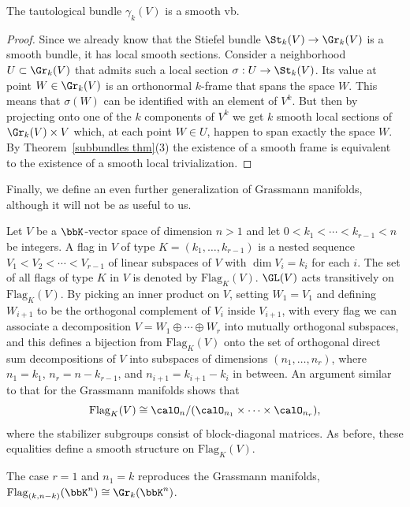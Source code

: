 \begin{prop}
    The tautological bundle $\gamma_k(V)$ is a smooth \gls{vb}.
\end{prop}
\begin{proof}
    Since we already know that the Stiefel bundle $\St_k(V)\to \Gr_k(V)$ is a smooth bundle, it has local smooth sections. Consider a neighborhood $U\subset \Gr_k(V)$ that admits such a local section $\sigma:U\to \St_k(V)$. Its value at point $W\in \Gr_k(V)$ is an orthonormal $k$-frame that spans the space $W$. This means that $\sigma(W)$ can be identified with an element of $V^k$. But then by projecting onto one of the $k$ components of $V^k$ we get $k$ smooth local sections of $\Gr_k(V)\times V$ which, at each point $W\in U$, happen to span exactly the space $W$. By Theorem~\ref{subbundles thm}(3) the existence of a smooth frame is equivalent to the existence of a smooth local trivialization.
\end{proof}

Finally, we define an even further generalization of Grassmann manifolds, although it will not be as useful to us.

\begin{defn}
    Let $V$ be a $\bbK$-vector space of dimension $n>1$ and let $0<k_1<\cdots<k_{r-1}<n$ be integers. A flag in $V$ of type $K=(k_1,\ldots,k_{r-1})$ is a nested sequence $V_1< V_2< \cdots < V_{r-1}$ of linear subspaces of $V$ with $\dim V_i=k_i$ for each $i$. The set of all flags of type $K$ in $V$ is denoted by $\mathrm{Flag}_K(V)$. $\GL(V)$ acts transitively on $\mathrm{Flag}_K(V)$. By picking an inner product on $V$, setting $W_1=V_1$ and defining $W_{i+1}$ to be the orthogonal complement of $V_i$ inside $V_{i+1}$, with every flag we can associate a decomposition $V=W_1\oplus \cdots\oplus W_r$ into mutually orthogonal subspaces, and this defines a bijection from $\mathrm{Flag}_K(V)$ onto the set of orthogonal direct sum decompositions of $V$ into subspaces of dimensions $(n_1,\ldots,n_r)$, where $n_1=k_1$, $n_r=n-k_{r-1}$, and $n_{i+1}=k_{i+1}-k_i$ in between. An argument similar to that for the Grassmann manifolds shows that
    \[\mathrm{Flag}_K(V)\cong \calO_n\slash (\calO_{n_1}\times\cdots\times\calO_{n_r}),\]
    where the stabilizer subgroups consist of block-diagonal matrices. As before, these equalities define a smooth structure on $\mathrm{Flag}_K(V)$.
\end{defn}

The case $r=1$ and $n_1=k$ reproduces the Grassmann manifolds, $\mathrm{Flag}_{(k,n-k)}(\bbK^n)\cong \Gr_k(\bbK^n)$.






